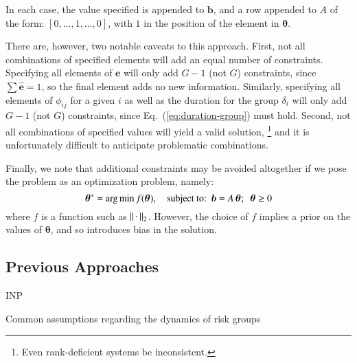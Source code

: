 In each case, the value specified is appended to $\bm{b}$,
and a row appended to $A$ of the form: $[0,\dots,1,\dots,0]$,
with $1$ in the position of the element in $\bm{\theta}$.
\par
There are, however, two notable caveats to this approach.
First, not all combinations of specified elements will add an equal number of constraints.
Specifying all elements of $\bm{e}$
will only add $G-1$ (not $G$) constraints,
since $\sum \bm{\hat{e}} = 1$, so the final element adds no new information.
Similarly, specifying all elements of $\phi_{ij}$ for a given $i$
as well as the duration for the group $\delta_i$
will only add $G-1$ (not $G$) constraints,
since Eq.~(\ref{eq:duration-group}) must hold.
Second, not all combinations of specified values will yield a valid solution,%
\footnote{Even rank-deficient systems be inconsistent.}
and it is unfortunately difficult to anticipate problematic combinations.
\par
Finally, we note that additional constraints may be avoided altogether if we pose the problem
as an optimization problem, namely:
\begin{equation}\label{eq:system-optimize}
\bm{\theta}^{*} = {\arg \min}
\thinspace f(\bm{\theta}),
\quad \textrm{subject to:}
\enspace\bm{b} = A\thinspace\bm{\theta};
\enspace\bm{\theta} \ge 0
\end{equation}
where $f$ is a function such as ${\left|\left| \thinspace\cdot\thinspace \right|\right|}_2$.
However, the choice of $f$ implies a prior on the values of $\bm{\theta}$,
and so introduces bias in the solution.
\subsection{Previous Approaches}
INP
\begin{floatbox}
  \caption{Common assumptions regarding the dynamics of risk groups}
  \label{box:assumptions}
  
\end{floatbox}


